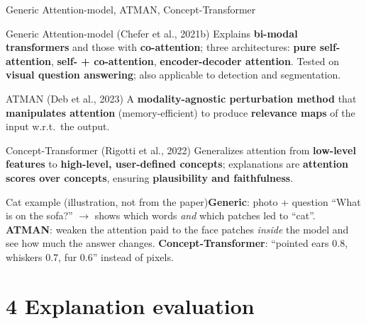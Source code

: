 \documentclass[10pt]{beamer}
\newcommand{\catex}[1]{\begin{exampleblock}{\footnotesize Cat example (illustration, not from the paper)}\footnotesize #1\end{exampleblock}}
\begin{document}
\begin{frame}{Generic Attention-model, ATMAN, Concept-Transformer}
\footnotesize
\begin{block}{Generic Attention-model (Chefer et al., 2021b)}
Explains \textbf{bi-modal transformers} and those with \textbf{co-attention}; three architectures: \textbf{pure self-attention}, \textbf{self- + co-attention}, \textbf{encoder-decoder attention}. Tested on \textbf{visual question answering}; also applicable to detection and segmentation.
\end{block}
\begin{block}{ATMAN (Deb et al., 2023)}
A \textbf{modality-agnostic perturbation method} that \textbf{manipulates attention} (memory-efficient) to produce \textbf{relevance maps} of the input w.r.t.\ the output.
\end{block}
\begin{block}{Concept-Transformer (Rigotti et al., 2022)}
Generalizes attention from \textbf{low-level features} to \textbf{high-level, user-defined concepts}; explanations are \textbf{attention scores over concepts}, ensuring \textbf{plausibility and faithfulness}.
\end{block}
\catex{\textbf{Generic}: photo + question ``What is on the sofa?'' $\to$ shows which words \emph{and} which patches led to ``cat''. \textbf{ATMAN}: weaken the attention paid to the face patches \emph{inside} the model and see how much the answer changes. \textbf{Concept-Transformer}: ``pointed ears 0.8, whiskers 0.7, fur 0.6'' instead of pixels.}
\end{frame}

\section{4 Explanation evaluation}
\end{document}
